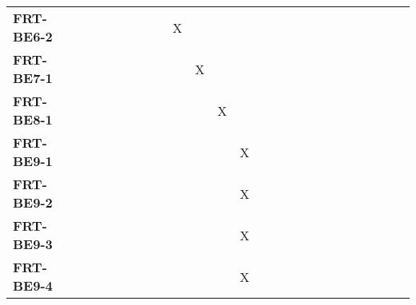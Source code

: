 \documentclass[12pt, titlepage]{article}
\begin{document}
\begin{landscape}
\begin{longtable}{|l|ccccccccccccccccc|}
		\textbf{FRT-BE6-2}  & ~                                                         & ~            & ~            & ~            & ~            & X            & ~            & ~            & ~            & ~             & ~             & ~             & ~             & ~             & ~             & ~             & ~             \\
		\textbf{FRT-BE7-1}  & ~                                                         & ~            & ~            & ~            & ~            & ~            & X            & ~            & ~            & ~             & ~             & ~             & ~             & ~             & ~             & ~             & ~             \\
		\textbf{FRT-BE8-1}  & ~                                                         & ~            & ~            & ~            & ~            & ~            & ~            & X            & ~            & ~             & ~             & ~             & ~             & ~             & ~             & ~             & ~             \\
		\textbf{FRT-BE9-1}  & ~                                                         & ~            & ~            & ~            & ~            & ~            & ~            & ~            & X            & ~             & ~             & ~             & ~             & ~             & ~             & ~             & ~             \\
		\textbf{FRT-BE9-2}  & ~                                                         & ~            & ~            & ~            & ~            & ~            & ~            & ~            & X            & ~             & ~             & ~             & ~             & ~             & ~             & ~             & ~             \\
		\textbf{FRT-BE9-3}  & ~                                                         & ~            & ~            & ~            & ~            & ~            & ~            & ~            & X            & ~             & ~             & ~             & ~             & ~             & ~             & ~             & ~             \\
		\textbf{FRT-BE9-4}  & ~                                                         & ~            & ~            & ~            & ~            & ~            & ~            & ~            & X            & ~             & ~             & ~             & ~             & ~             & ~             & ~             & ~             \\

\end{longtable}
\end{landscape}
\end{document}
